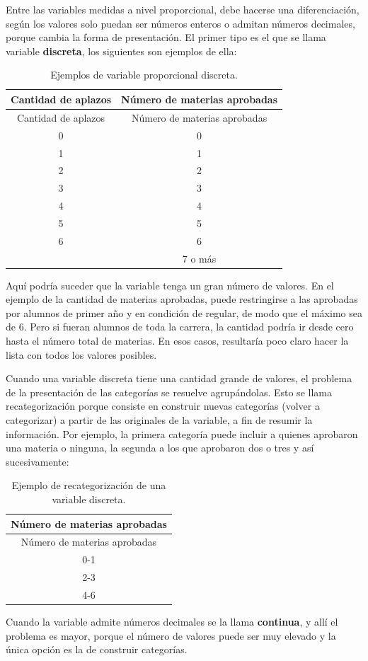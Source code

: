 \documentclass[]{book}
\begin{document}
Entre las variables medidas a nivel proporcional, debe hacerse una diferenciación, según los valores solo puedan ser números enteros o admitan números decimales, porque cambia la forma de presentación. El primer tipo es el que se llama variable \textbf{discreta}, los siguientes son ejemplos de ella:

\begin{longtable}[]{@{}cc@{}}
\caption{\label{tab:unnamed-chunk-12}Ejemplos de variable proporcional discreta.}\tabularnewline
\toprule
Cantidad de aplazos & Número de materias aprobadas\tabularnewline
\midrule
\endfirsthead
\toprule
Cantidad de aplazos & Número de materias aprobadas\tabularnewline
\midrule
\endhead
0 & 0\tabularnewline
1 & 1\tabularnewline
2 & 2\tabularnewline
3 & 3\tabularnewline
4 & 4\tabularnewline
5 & 5\tabularnewline
6 & 6\tabularnewline
& 7 o más\tabularnewline
\bottomrule
\end{longtable}

Aquí podría suceder que la variable tenga un gran número de valores. En el ejemplo de la cantidad de materias aprobadas, puede restringirse a las aprobadas por alumnos de primer año y en condición de regular, de modo que el máximo sea de 6. Pero si fueran alumnos de toda la carrera, la cantidad podría ir desde cero hasta el número total de materias. En esos casos, resultaría poco claro hacer la lista con todos los valores posibles.

Cuando una variable discreta tiene una cantidad grande de valores, el problema de la presentación de las categorías se resuelve agrupándolas. Esto se llama recategorización porque consiste en construir nuevas categorías (volver a categorizar) a partir de las originales de la variable, a fin de resumir la información. Por ejemplo, la primera categoría puede incluir a quienes aprobaron una materia o ninguna, la segunda a los que aprobaron dos o tres y así sucesivamente:

\begin{longtable}[]{@{}c@{}}
\caption{\label{tab:unnamed-chunk-13}Ejemplo de recategorización de una variable discreta.}\tabularnewline
\toprule
Número de materias aprobadas\tabularnewline
\midrule
\endfirsthead
\toprule
Número de materias aprobadas\tabularnewline
\midrule
\endhead
0-1\tabularnewline
2-3\tabularnewline
4-6\tabularnewline
\bottomrule
\end{longtable}

Cuando la variable admite números decimales se la llama \textbf{continua}, y allí el problema es mayor, porque el número de valores puede ser muy elevado y la única opción es la de construir categorías.
\end{document}
